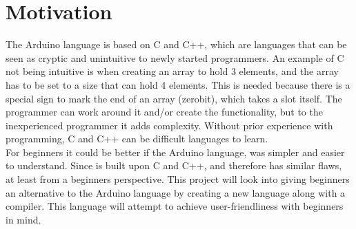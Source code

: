\section{Motivation}\label{introduction:motivation}
The Arduino language is based on C and C++, which are languages that can be seen as cryptic and unintuitive to newly started programmers. An example of C not being intuitive is when creating an array to hold 3 elements, and the array has to be set to a size that can hold 4 elements. This is needed because there is a special sign to mark the end of an array (zerobit), which takes a slot itself. The programmer can work around it and/or create the functionality, but to the inexperienced programmer it adds complexity. Without prior experience with programming, C and C++ can be difficult languages to learn. \\
For beginners it could be better if the Arduino language, was simpler and easier to understand. Since is built upon C and C++, and therefore has similar flaws, at least from a beginners perspective. This project will look into giving beginners an alternative to the Arduino language by creating a new language along with a compiler. This language will attempt to achieve user-friendliness with beginners in mind. 